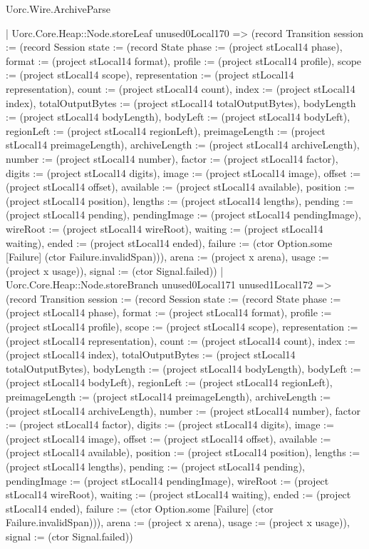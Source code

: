 \begin{lexlean}{Uorc.Wire.ArchiveParse}
\begin{semanticmodule}
{            | Uorc.Core.Heap::Node.storeLeaf unused0Local170 => (record Transition {session := (record Session {state := (record State {phase := (project stLocal14 phase), format := (project stLocal14 format), profile := (project stLocal14 profile), scope := (project stLocal14 scope), representation := (project stLocal14 representation), count := (project stLocal14 count), index := (project stLocal14 index), totalOutputBytes := (project stLocal14 totalOutputBytes), bodyLength := (project stLocal14 bodyLength), bodyLeft := (project stLocal14 bodyLeft), regionLeft := (project stLocal14 regionLeft), preimageLength := (project stLocal14 preimageLength), archiveLength := (project stLocal14 archiveLength), number := (project stLocal14 number), factor := (project stLocal14 factor), digits := (project stLocal14 digits), image := (project stLocal14 image), offset := (project stLocal14 offset), available := (project stLocal14 available), position := (project stLocal14 position), lengths := (project stLocal14 lengths), pending := (project stLocal14 pending), pendingImage := (project stLocal14 pendingImage), wireRoot := (project stLocal14 wireRoot), waiting := (project stLocal14 waiting), ended := (project stLocal14 ended), failure := (ctor Option.some [Failure] (ctor Failure.invalidSpan))}), arena := (project x arena), usage := (project x usage)}), signal := (ctor Signal.failed)})
            | Uorc.Core.Heap::Node.storeBranch unused0Local171 unused1Local172 => (record Transition {session := (record Session {state := (record State {phase := (project stLocal14 phase), format := (project stLocal14 format), profile := (project stLocal14 profile), scope := (project stLocal14 scope), representation := (project stLocal14 representation), count := (project stLocal14 count), index := (project stLocal14 index), totalOutputBytes := (project stLocal14 totalOutputBytes), bodyLength := (project stLocal14 bodyLength), bodyLeft := (project stLocal14 bodyLeft), regionLeft := (project stLocal14 regionLeft), preimageLength := (project stLocal14 preimageLength), archiveLength := (project stLocal14 archiveLength), number := (project stLocal14 number), factor := (project stLocal14 factor), digits := (project stLocal14 digits), image := (project stLocal14 image), offset := (project stLocal14 offset), available := (project stLocal14 available), position := (project stLocal14 position), lengths := (project stLocal14 lengths), pending := (project stLocal14 pending), pendingImage := (project stLocal14 pendingImage), wireRoot := (project stLocal14 wireRoot), waiting := (project stLocal14 waiting), ended := (project stLocal14 ended), failure := (ctor Option.some [Failure] (ctor Failure.invalidSpan))}), arena := (project x arena), usage := (project x usage)}), signal := (ctor Signal.failed)})
}
\end{semanticmodule}
\end{lexlean}
